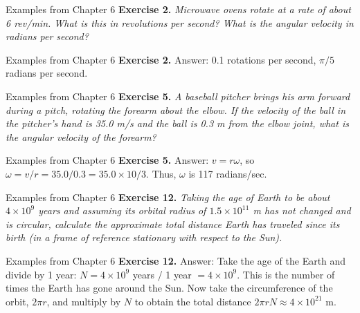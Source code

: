 \documentclass{beamer}
\begin{document}
\begin{frame}{Examples from Chapter 6}
\textbf{Exercise 2.} \textit{Microwave ovens rotate at a rate of about 6 rev/min. What is this in revolutions per second? What is the angular velocity in radians per second?}
\end{frame}

\begin{frame}{Examples from Chapter 6}
\textbf{Exercise 2.} \alert{Answer:} 0.1 rotations per second, $\pi/5$ radians per second.
\end{frame}

\begin{frame}{Examples from Chapter 6}
\textbf{Exercise 5.} \textit{A baseball pitcher brings his arm forward during a pitch, rotating the forearm about the elbow. If the velocity of the ball in the pitcher’s hand is 35.0 m/s and the ball is 0.3 m from the elbow joint, what is the angular velocity of the forearm?}
\end{frame}

\begin{frame}{Examples from Chapter 6}
\textbf{Exercise 5.} \alert{Answer:} $v = r\omega$, so $\omega = v/r = 35.0/0.3 = 35.0 \times 10/3$.  Thus, $\omega$ is 117 radians/sec.
\end{frame}

\begin{frame}{Examples from Chapter 6}
\textbf{Exercise 12.} \textit{Taking the age of Earth to be about $4\times 10^9$ years and assuming its orbital radius of $1.5 \times 10^{11}$ m has not changed
and is circular, calculate the approximate total distance Earth has traveled since its birth (in a frame of reference stationary with respect to the Sun).}
\end{frame}

\begin{frame}{Examples from Chapter 6}
\textbf{Exercise 12.} \alert{Answer:} Take the age of the Earth and divide by 1 year: $N = 4 \times 10^{9}$ years / 1 year $ = 4 \times 10^{9}$. This is the number of times the Earth has gone around the Sun.  Now take the circumference of the orbit, $2\pi r$, and multiply by $N$ to obtain the total distance $2\pi rN \approx 4\times 10^{21}$ m.
\end{frame}
\end{document}
